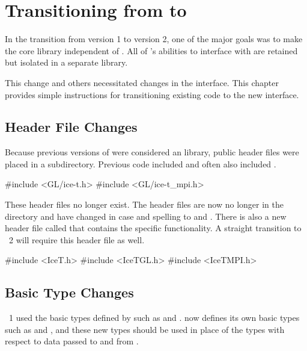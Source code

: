 

\chapter{Transitioning from  to }
\label{chap:Transitioning}

In the transition from \IceT version 1 to \IceT version 2, one of the major
goals was to make the core \IceT library independent of \OpenGL.  All of
\IceT's abilities to interface with \OpenGL are retained but isolated in a
separate library.

This change and others necessitated changes in the \IceT interface.  This
chapter provides simple instructions for transitioning existing code to the
new \IceT interface.

\section{Header File Changes}
\label{sec:Transitioning:Header_File_Changes}

Because previous versions of \IceT were considered an \OpenGL library,
public header files were placed in a  subdirectory.  Previous
code included  and often
also included
.
\begin{code}
#include <GL/ice-t.h>
#include <GL/ice-t_mpi.h>
\end{code}

These header files no longer exist.  The header files are now no longer in
the  directory and have changed in case and spelling to
 and .  There
is also a new header file called  that
contains the specific \OpenGL functionality.  A straight transition to
\IceT~2 will require this header file as well.
\begin{code}
#include <IceT.h>
#include <IceTGL.h>
#include <IceTMPI.h>
\end{code}

\section{Basic Type Changes}
\label{sec:Transitioning:Basic_Type_Changes}

\IceT~1 used the basic types defined by \OpenGL such as
 and .  \IceT now
defines its own basic types such as  and
, and these new types should be used in
place of the \OpenGL types with respect to data passed to and from \IceT.

